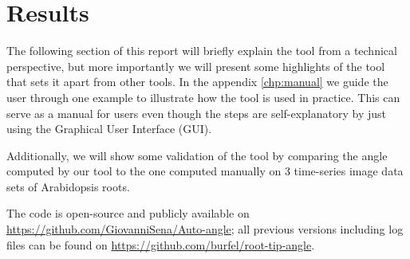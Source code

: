 
\chapter{Results} %

\label{results} %

%





The following section of this report will briefly explain the tool from a technical perspective, but more importantly  %
we will present some highlights of the tool that sets it apart from other tools. In the appendix \ref{chp:manual} we guide the user through one example to illustrate how the tool is used in practice. This can serve as a manual for users even though the steps are self-explanatory by just using the Graphical User Interface (GUI). 

Additionally, we will show some validation of the tool by comparing the angle computed by our tool to the one computed manually on 3 time-series image data sets of Arabidopsis roots.

The code is open-source and publicly available on \url{https://github.com/GiovanniSena/Auto-angle}; all previous versions including log files can be found on \url{https://github.com/burfel/root-tip-angle}.


%
%


